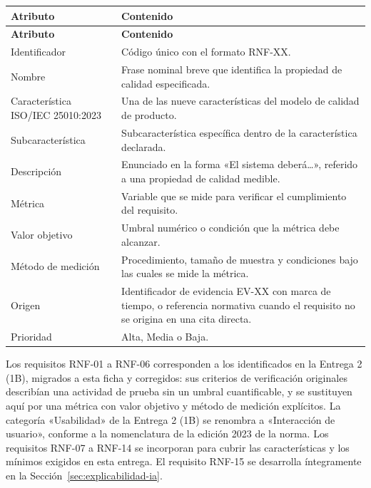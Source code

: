 \documentclass[12pt,a4paper]{article}
\begin{document}
\begin{center}
\begin{longtable}{|p{3.8cm}|p{10.4cm}|}
\hline
\textbf{Atributo} & \textbf{Contenido} \\
\hline
\endfirsthead
\hline
\textbf{Atributo} & \textbf{Contenido} \\
\hline
\endhead
\hline
\endfoot
\hline
\endlastfoot
Identificador & Código único con el formato RNF-XX. \\
\hline
Nombre & Frase nominal breve que identifica la propiedad de calidad especificada. \\
\hline
Característica ISO/IEC 25010:2023 & Una de las nueve características del modelo de calidad de producto. \\
\hline
Subcaracterística & Subcaracterística específica dentro de la característica declarada. \\
\hline
Descripción & Enunciado en la forma «El sistema deberá\ldots», referido a una propiedad de calidad medible. \\
\hline
Métrica & Variable que se mide para verificar el cumplimiento del requisito. \\
\hline
Valor objetivo & Umbral numérico o condición que la métrica debe alcanzar. \\
\hline
Método de medición & Procedimiento, tamaño de muestra y condiciones bajo las cuales se mide la métrica. \\
\hline
Origen & Identificador de evidencia EV-XX con marca de tiempo, o referencia normativa cuando el requisito no se origina en una cita directa. \\
\hline
Prioridad & Alta, Media o Baja. \\
\hline
\end{longtable}
\label{tab:plantilla-rnf}
\end{center}

Los requisitos RNF-01 a RNF-06 corresponden a los identificados en la Entrega 2 (1B), migrados a esta ficha y corregidos: sus criterios de verificación originales describían una actividad de prueba sin un umbral cuantificable, y se sustituyen aquí por una métrica con valor objetivo y método de medición explícitos. La categoría «Usabilidad» de la Entrega 2 (1B) se renombra a «Interacción de usuario», conforme a la nomenclatura de la edición 2023 de la norma. Los requisitos RNF-07 a RNF-14 se incorporan para cubrir las características y los mínimos exigidos en esta entrega. El requisito RNF-15 se desarrolla íntegramente en la Sección~\ref{sec:explicabilidad-ia}.
\end{document}
